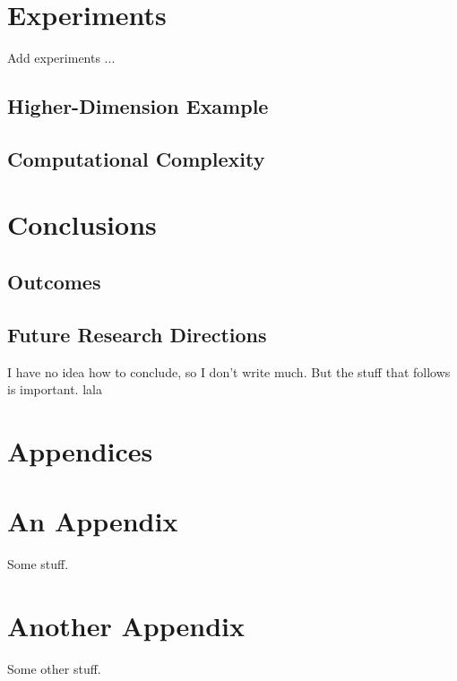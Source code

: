 \documentclass[11pt,twoside]{article}
\newtheorem{Corollary}{Corollary}
\newtheorem{Proposition}{Proposition}
\numberwithin{Theorem}{section}
\numberwithin{Definition}{section}
\numberwithin{Lemma}{section}
\numberwithin{Algorithm}{section}
\numberwithin{equation}{section}
\begin{document}





\section{Experiments}
Add experiments ...

\subsection{Higher-Dimension Example}

\subsection{Computational Complexity}
\clearpage

\section{Conclusions}

\subsection{Outcomes}

\subsection{Future Research Directions}
I have no idea how to conclude, so I don't write much. But the stuff that follows is important. lala
\clearpage

\printbibliography
\clearpage

\appendix
\section*{Appendices}

\section{An Appendix}
\label{app:one}

Some stuff.
\clearpage

\section{Another Appendix}
\label{app:two}

Some other stuff.
\end{document}
